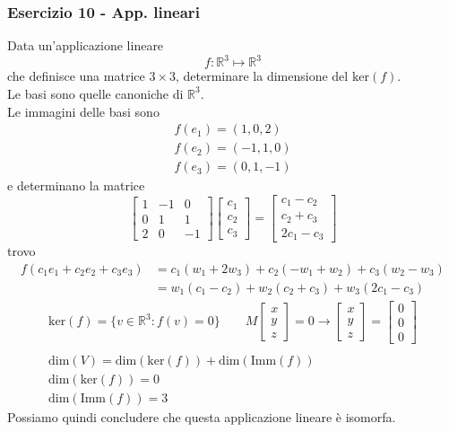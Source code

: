 \documentclass[italian]{article}
\newcommand{\ins}[1]{\text{$\mathbb{#1}$}}
\renewcommand{\dim}[1]{\text{dim$\left(#1\right)$}}
\renewcommand{\ker}[1]{\text{ker$\left(#1\right)$}}
\newcommand{\imm}[1]{\text{Imm$\left(#1\right)$}}
\begin{document}
\subsubsection{Esercizio 10 - App. lineari}
Data un'applicazione lineare
\[
	f: \ins{R}^3 \longmapsto \ins{R}^3
\]
che definisce una matrice $3 \times 3$, determinare la dimensione del $\ker{f}$.\\[2mm]
Le basi sono quelle canoniche di $\ins{R}^3$.\\[2mm]
Le immagini delle basi sono
\begin{gather*}
	f(e_1) = (1,0,2) \\
	f(e_2) = (-1,1,0) \\
	f(e_3) = (0,1,-1)
\end{gather*}
e determinano la matrice
\[
	\begin{bmatrix}
		1 & -1 & 0 \\
		0 & 1 & 1 \\
		2 & 0 & -1
	\end{bmatrix}
	\begin{bmatrix}
		c_1 \\ c_2 \\ c_3
	\end{bmatrix}
	=
	\begin{bmatrix}
		c_1 - c_2 \\ c_2 + c_3 \\ 2c_1 - c_3
	\end{bmatrix}
\]
trovo
\[
	\begin{split}
		f(c_1e_1 + c_2e_2 + c_3e_3) &= c_1(w_1 + 2w_3) + c_2(-w_1 + w_2) + c_3(w_2 - w_3) \\
		&= w_1(c_1 - c_2) + w_2(c_2 + c_3) + w_3(2c_1 - c_3)
	\end{split}
\]
\begin{gather*}
	\ker{f} = \{ v \in \ins{R}^3 : f(v) = 0 \} \qquad M\begin{bmatrix}x \\ y \\z\end{bmatrix} = 0 \to \begin{bmatrix}x \\ y \\z\end{bmatrix} = \begin{bmatrix}0\\0\\0\end{bmatrix} \\\\
	\dim{V} = \dim{\ker{f}} + \dim{\imm{f}} \\
	\dim{\ker{f}} = 0 \\
	\dim{\imm{f}} = 3
\end{gather*}
Possiamo quindi concludere che questa applicazione lineare è isomorfa.
\end{document}

